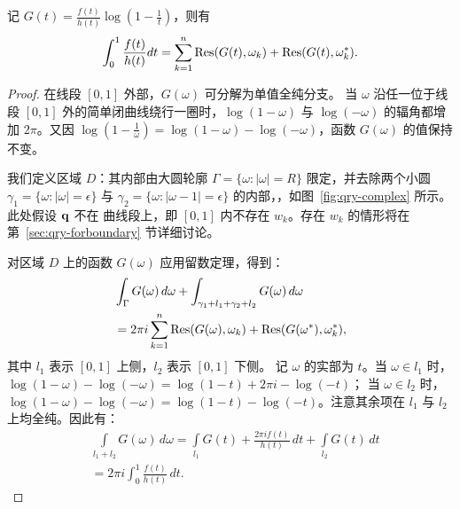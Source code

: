 \begin{theorem}\label{pro:qry-general}
记 $G(t)=\frac{f(t)}{h(t)}\log(1-\frac{1}{t})$，则有
\begin{equation}\label{equ:qry-closed_form_expr}
\int_0^1 \frac{f(t)}{ h(t)}dt=\sum_{k=1}^{n}\mathop{\mathrm{Res}}(G(t),\omega_k)+\mathop{\mathrm{Res}}(G(t),\omega_k^*).
\end{equation}
\end{theorem}
\begin{proof}
在线段 \([0,1]\) 外部，$G(\omega)$ 可分解为单值全纯分支。
当 \(\omega\) 沿任一位于线段 \([0,1]\) 外的简单闭曲线绕行一圈时，\(\log(1-\omega)\) 与 \(\log(-\omega)\) 的辐角都增加 \(2\pi\)。又因 \(\log(1-\frac{1}{\omega})=\log(1-\omega)-\log(-\omega)\)，函数 $G(\omega)$ 的值保持不变。

我们定义区域 $D$：其内部由大圆轮廓 \(\Gamma = \{ \omega : |\omega| = R \}\) 限定，并去除两个小圆 \(\gamma_1 = \{ \omega : |\omega| = \epsilon \}\) 与 \(\gamma_2 = \{ \omega : |\omega - 1| = \epsilon \}\) 的内部，，如图~\ref{fig:qry-complex} 所示。此处假设 \(\mathbf{q}\) 不在 \Bezier 曲线段上，即 \([0,1]\) 内不存在 \(w_k\)。存在 \(w_k\) 的情形将在第~\ref{sec:qry-forboundary} 节详细讨论。

%
对区域 $D$ 上的函数 $G(\omega)$ 应用留数定理，得到：
    \begin{equation}\label{equ:qry-residue_theorem}
        \begin{aligned}
            &\int_{\Gamma} G(\omega) \, d\omega + \int_{\gamma_1+l_1+\gamma_2+l_2} G(\omega) \, d\omega\\
            &= 2\pi i \sum_{k=1}^{n} \mathop{\mathrm{Res}}(G(\omega), \omega_k)+\mathop{\mathrm{Res}}(G(\omega^*), \omega_k^*),
        \end{aligned}
    \end{equation}
其中 \(l_1\) 表示 \([0,1]\) 上侧，\(l_2\) 表示 \([0,1]\) 下侧。
记 \(\omega\) 的实部为 \(t\)。当 \(\omega\in l_1\) 时，\(\log(1-\omega)-\log(-\omega)=\log(1-t)+2\pi i-\log(-t)\)；
当 \(\omega\in l_2\) 时，\(\log(1-\omega)-\log(-\omega)=\log(1-t)-\log(-t)\)。注意其余项在 \(l_1\) 与 \(l_2\) 上均全纯。因此有：
\begin{equation}\label{equ:qry-l1l2}
\begin{aligned}
    &\int\limits_{l_1+l_2} G(\omega) \, d\omega=\int\limits_{l_1} G(t) +\frac{2\pi i f(t)}{h(t)}\, dt+\int\limits_{l_2} G(t) \, dt\\
    &=2\pi i \int_{0}^{1} \frac{ f(t)}{h(t)} \, dt.
    \end{aligned}
\end{equation}
 

\end{proof}
